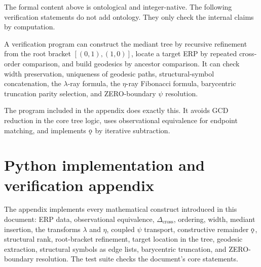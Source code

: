 \documentclass[11pt, letterpaper]{article}
\newcommand{\lop}{\lambda}
\newcommand{\aop}{\eta}
\newcommand{\Dcross}{\Delta_{\mathrm{cross}}}
\newcommand{\koppa}{\mathbin{\text{\rm\k{o}}}}
\theoremstyle{definition}
\theoremstyle{plain}
\begin{document}
\begin{verifybox}
The formal content above is ontological and integer-native.  The following
verification statements do not add ontology.  They only check the internal
claims by computation.

A verification program can construct the mediant tree by recursive refinement
from the root bracket $[(0,1),(1,0)]$, locate a target ERP by repeated
cross-order comparison, and build geodesics by ancestor comparison.  It can
check width preservation, uniqueness of geodesic paths, structural-symbol
concatenation, the $\lop$-ray formula, the $\aop$-ray Fibonacci formula,
barycentric truncation parity selection, and ZERO-boundary $\psi$ resolution.

The program included in the appendix does exactly this.  It avoids GCD
reduction in the core tree logic, uses observational equivalence for endpoint
matching, and implements $\koppa$ by iterative subtraction.
\end{verifybox}

\appendix

\section{Python implementation and verification appendix}

The appendix implements every mathematical construct introduced in this document:
ERP data, observational equivalence, $\Dcross$, ordering, width, mediant
insertion, the transforms $\lop$ and $\aop$, coupled $\psi$ transport,
constructive remainder $\koppa$, structural rank, root-bracket refinement,
target location in the tree, geodesic extraction, structural symbols as edge
lists, barycentric truncation, and ZERO-boundary resolution.  The test suite
checks the document's core statements.
\end{document}
